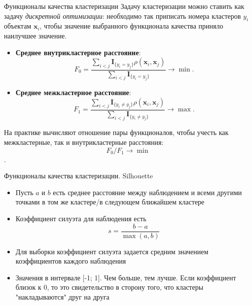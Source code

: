 \documentclass[unicode, notheorems, handout]{beamer}
\begin{document}
\begin{frame}{Функционалы качества кластеризации}
\small
Задачу кластеризации можно ставить как задачу \emph{дискретной оптимизации}: необходимо так приписать номера кластеров $y_i$ объектам $\pmb{x}_i$, чтобы значение выбранного функционала качества приняло наилучшее значение. 
 
    \begin{itemize}

 \item  \textbf{Среднее внутрикластерное расстояние}: $$F_0 = \frac{\sum_{i < j}\mathbf{I}_{\{y_i = y_j\}}\rho(\pmb{x}_i, \pmb{x}_j)}{\sum_{i < j}\mathbf{I}_{\{y_i = y_j\}}}\to \min .$$
       \item \textbf{Среднее межкластерное расстояние}: $$F_1 = \frac{\sum_{i < j}\mathbf{I}_{\{y_i \neq y_j\}}\rho(\pmb{x}_i,\pmb{x}_j)}{\sum_{i < j}\mathbf{I}_{\{y_i \neq y_j\}}}\to \max.$$
   \end{itemize}
   
На практике вычисляют отношение пары функционалов, чтобы учесть как межкластерные, так и внутрикластерные расстояния: $$F_0/F_1\to\min$$.
\end{frame}


\begin{frame}{Функционалы качества кластеризации. Silhouette}
\footnotesize

\begin{itemize}
\item Пусть \( a \) и \( b \) есть среднее расстояние между наблюдением и всеми другими точками в том же кластере/в следующем ближайшем кластере
\item Коэффициент силуэта для наблюдения есть
\[s = \frac{b - a}{\max(a, b)}\]
\item Для выборки коэффициент силуэта задается средним значением коэффициентов каждого наблюдения
\item Значения в интервале [-1; 1]. Чем больше, тем лучше. Если коэффициент близок к 0, то это свидетельство в сторону того, что кластеры "накладываются" друг на друга
\end{itemize}

\end{frame}
\end{document}
